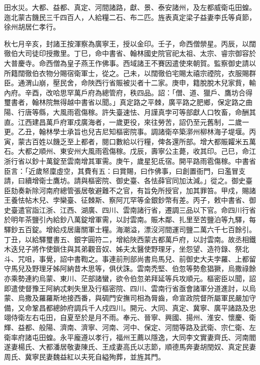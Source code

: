 \begin{pinyinscope}
田水災。大都、益都、真定、河間諸路，獻、景、泰安諸州，及左都威衛屯田蝗。迤北蒙古饑民三千四百人，人給糧二石、布二匹。旌表真定梁子益妻李氏等貞節，徐州胡居仁孝行。



 秋七月辛亥，封諸王按渾察為廣寧王，授以金印。壬子，命西僧禜星。丙辰，以闊徹伯大司徒印授撒里。丁巳，命中書省、翰林國史院官祀太祖、太宗、睿宗御容於大普慶寺。命西僧為皇子燕王作佛事。西域諸王不賽因遣使來朝賀。監察御史請以所籍闊徹伯衣物分賜宿衛軍士，從之。己未，以闊徹伯宅賜太禧宗禋院，衣服賜群臣。通渭山崩，壓民舍，命陜西行省賑被災者十二家。庚申，籍脫脫木兒家貲，輸內府。辛酉，改哈思罕萬戶府為總管府，秩四品。詔：「僧、道、獵戶、鷹坊合得璽書者，翰林院無得越中書省以聞。」真定路之平棘，廣平路之肥鄉，保定路之曲陽、行唐等縣，大風雨雹傷稼。許失臺速怯、月謹真孛可等部獻人口牧畜，命酬其直。江西建昌萬戶府軍戍廣海者，一歲更役，來往勞苦，詔仍至元舊制，二歲一更。乙丑，翰林學士承旨也兒吉尼知樞密院事。調諸衛卒築漷州柳林海子堤堰。丙寅，蒙古百姓以饑乏至上都者，閱口數給以行糧，俾各還所部。增大都賑糶米五萬石。大都之順州、東安州大風雨雹傷稼。戊辰，壽寧公主薨，收其印。己巳，命江浙行省以鈔十萬錠至雲南增其軍需。庚午，歲星犯氐宿。開平路雨雹傷稼。中書省臣言：「近歲帑廩虛空，其費有五：曰賞賜，曰作佛事，曰創置衙門，曰濫冒支請，曰續增衛士鷹坊。請與樞密院、御史臺、各怯薛官同加汰減。」從之。御史臺臣劾奏新除河南府總管張居敬避難不之官，有旨免所授官，加其罪笞。甲戍，賜諸王養怯帖木兒、孛欒臺、征棘斯、察阿兀罕等金銀鈔幣有差。丙子，敕中書省、御史臺遣官詣江浙、江西、湖廣、四川、雲南諸行省，遷調三品以下官。命四川行省於明年茶鹽引內給鈔八萬錠增軍需，以討雲南。賑木鄰、扎里至苦鹽泊等九驛，每驛鈔五百錠。增給戍居庸關軍士糧。海潮溢，漂沒河間運司鹽二萬六千七百餘引。丁丑，以給驛璽書五、銀字圓符二，增給陜西蒙古都萬戶府，以討雲南。故丞相鐵木迭兒子將作使鎖住與其弟觀音奴、姊夫太醫使野理牙，坐怨望、造符錄、祭北斗、咒咀，事覺，詔中書鞫之。事連前刑部尚書烏馬兒、前御史大夫孛羅、上都留守馬兒及野理牙姊阿納昔木思等，俱伏誅。雲南禿堅、伯忽等勢愈猖獗，烏撒祿餘亦乘勢連約烏蒙、東川、茫部諸蠻，欲令伯忽弟拜延等兵攻順元。樞密臣以聞，詔即遣使督豫王阿納忒剌失里及行樞密院、四川、雲南行省亟會諸軍分道進討，以烏蒙、烏撒及羅羅斯地接西番，與碉門安撫司相為脣齒，命宣政院督所屬軍民嚴加守備，又命鞏昌都總帥府調兵千人戍四川。開元、大同、真定、冀寧、廣平諸路及忠翊侍衛左右屯田，自夏至於是月不雨。奉元、晉寧、興國、揚州、淮安、懷慶、衛輝、益都、般陽、濟南、濟寧、河南、河中、保定、河間等路及武衛、宗仁衛、左衛率府諸屯田蝗。永平龐遵以孝行，福州王薦以隱逸，大同李文實妻齊氏、河南閻遂妻楊氏、大都潘居敬妻陳氏、王成妻高氏以志節，順德馬奔妻胡閏奴、真定民妻周氏、冀寧民妻魏益紅以夫死自縊殉葬，並旌其門。




\end{pinyinscope}
